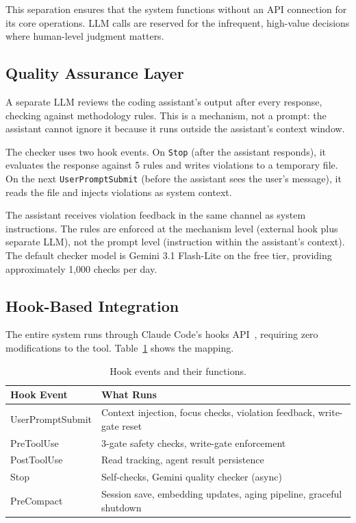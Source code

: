 \documentclass[11pt,a4paper]{article}
\begin{document}
This separation ensures that the system functions without an API connection for its core operations.
LLM calls are reserved for the infrequent, high-value decisions where human-level judgment matters.


\subsection{Quality Assurance Layer}

A separate LLM reviews the coding assistant's output after every response, checking against methodology rules.
This is a mechanism, not a prompt: the assistant cannot ignore it because it runs outside the assistant's context window.

The checker uses two hook events.
On \texttt{Stop} (after the assistant responds), it evaluates the response against 5 rules and writes violations to a temporary file.
On the next \texttt{UserPromptSubmit} (before the assistant sees the user's message), it reads the file and injects violations as system context.

The assistant receives violation feedback in the same channel as system instructions.
The rules are enforced at the mechanism level (external hook plus separate LLM), not the prompt level (instruction within the assistant's context).
The default checker model is Gemini 3.1 Flash-Lite on the free tier, providing approximately 1,000 checks per day.


\subsection{Hook-Based Integration}

The entire system runs through Claude Code's hooks API~\cite{claudecodehooks}, requiring zero modifications to the tool.
Table~\ref{tab:hooks} shows the mapping.

\begin{table}[h]
\centering
\caption{Hook events and their functions.}
\label{tab:hooks}
\small
\begin{tabularx}{\textwidth}{lX}
\toprule
\textbf{Hook Event} & \textbf{What Runs} \\
\midrule
UserPromptSubmit & Context injection, focus checks, violation feedback, write-gate reset \\
PreToolUse & 3-gate safety checks, write-gate enforcement \\
PostToolUse & Read tracking, agent result persistence \\
Stop & Self-checks, Gemini quality checker (async) \\
PreCompact & Session save, embedding updates, aging pipeline, graceful shutdown \\
\bottomrule
\end{tabularx}
\end{table}
\end{document}
